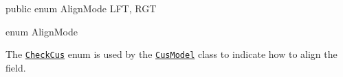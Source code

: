 \begin{elisting}
\begin{javacode}
public enum AlignMode { LFT, RGT }
\end{javacode}
\caption{enum AlignMode}\label{lst:AlignMode}
\end{elisting}
The \hyperref[lst:CheckCus]{\texttt{CheckCus}} enum is used by the 
\hyperref[lst:CusModel]{\texttt{CusModel}} class to indicate how to align the 
field.

\vfill
